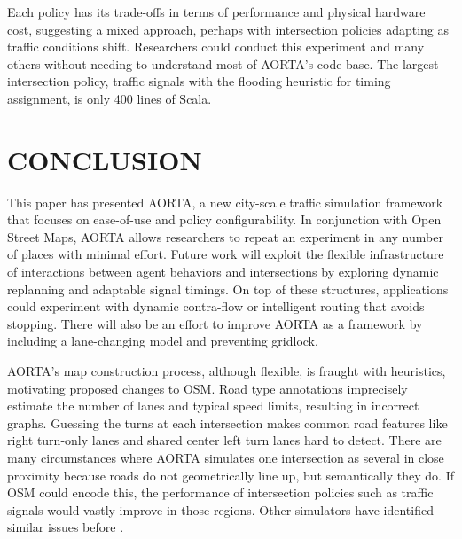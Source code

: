 \documentclass[letterpaper, 10 pt, conference]{ieeeconf}  %
\begin{document}
Each policy has its trade-offs in terms of performance and physical hardware
cost, suggesting a mixed approach, perhaps with intersection policies adapting
as traffic conditions shift. Researchers could conduct this experiment and many
others without needing to understand most of AORTA's code-base. The largest
intersection policy, traffic signals with the flooding heuristic for timing
assignment, is only 400 lines of Scala.


\section{CONCLUSION}
\label{sec:conclusion}

This paper has presented AORTA, a new city-scale traffic simulation framework
that focuses on ease-of-use and policy configurability. In conjunction with Open
Street Maps, AORTA allows researchers to repeat an experiment in any number of
places with minimal effort. Future work will exploit the flexible infrastructure
of interactions between agent behaviors and intersections by exploring dynamic
replanning and adaptable signal timings. On top of these structures,
applications could experiment with dynamic contra-flow \cite{ITSC11-hausknecht}
or intelligent routing that avoids stopping. There will also be an effort to
improve AORTA as a framework by including a lane-changing model and preventing
gridlock. 

AORTA's map construction process, although flexible, is fraught with heuristics,
motivating proposed changes to OSM. Road type annotations imprecisely estimate
the number of lanes and typical speed limits, resulting in incorrect graphs.
Guessing the turns at each intersection makes common road features like right
turn-only lanes and shared center left turn lanes hard to detect. There are many
circumstances where AORTA simulates one intersection as several in close
proximity because roads do not geometrically line up, but semantically they do.
If OSM could encode this, the performance of intersection policies such as
traffic signals would vastly improve in those regions. Other simulators have
identified similar issues before \cite{Krajzewicz_Hertkorn_Ringel_Wagner_2005}.

\end{document}
